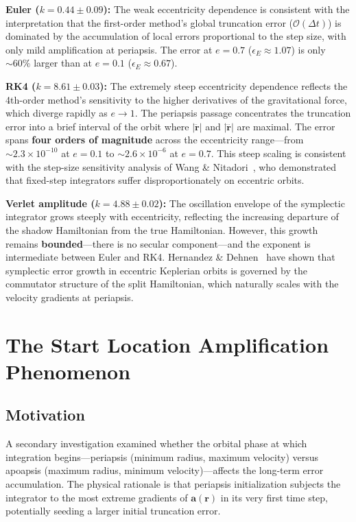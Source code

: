 \documentclass[twocolumn, 10pt]{article}
\begin{document}
\textbf{Euler ($k = 0.44 \pm 0.09$):} The weak eccentricity dependence is consistent with the interpretation that the first-order method's global truncation error ($\mathcal{O}(\Delta t)$) is dominated by the accumulation of local errors proportional to the step size, with only mild amplification at periapsis. The error at $e = 0.7$ ($\epsilon_E \approx 1.07$) is only ${\sim}60\%$ larger than at $e = 0.1$ ($\epsilon_E \approx 0.67$).

\textbf{RK4 ($k = 8.61 \pm 0.03$):} The extremely steep eccentricity dependence reflects the 4th-order method's sensitivity to the higher derivatives of the gravitational force, which diverge rapidly as $e \to 1$. The periapsis passage concentrates the truncation error into a brief interval of the orbit where $|\dddot{\mathbf{r}}|$ and $|\ddddot{\mathbf{r}}|$ are maximal. The error spans \textbf{four orders of magnitude} across the eccentricity range---from $\sim 2.3 \times 10^{-10}$ at $e = 0.1$ to $\sim 2.6 \times 10^{-6}$ at $e = 0.7$. This steep scaling is consistent with the step-size sensitivity analysis of Wang \& Nitadori~\cite{wang2020}, who demonstrated that fixed-step integrators suffer disproportionately on eccentric orbits.

\textbf{Verlet amplitude ($k = 4.88 \pm 0.02$):} The oscillation envelope of the symplectic integrator grows steeply with eccentricity, reflecting the increasing departure of the shadow Hamiltonian from the true Hamiltonian. However, this growth remains \textbf{bounded}---there is no secular component---and the exponent is intermediate between Euler and RK4. Hernandez \& Dehnen~\cite{hernandez2016} have shown that symplectic error growth in eccentric Keplerian orbits is governed by the commutator structure of the split Hamiltonian, which naturally scales with the velocity gradients at periapsis.

\section{The Start Location Amplification Phenomenon}
\label{sec:start_location}

\subsection{Motivation}

A secondary investigation examined whether the orbital phase at which integration begins---periapsis (minimum radius, maximum velocity) versus apoapsis (maximum radius, minimum velocity)---affects the long-term error accumulation. The physical rationale is that periapsis initialization subjects the integrator to the most extreme gradients of $\mathbf{a}(\mathbf{r})$ in its very first time step, potentially seeding a larger initial truncation error.
\end{document}
